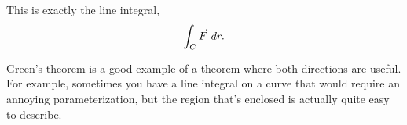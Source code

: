 \begin{center}
\end{center}

This is exactly the line integral, $$\int_{C}\vec{F} \ dr. $$

Green's theorem is a good example of a theorem where both directions are useful. For example, sometimes you have a line integral on a curve that would require an annoying parameterization, but the region that's enclosed is actually quite easy to describe.


